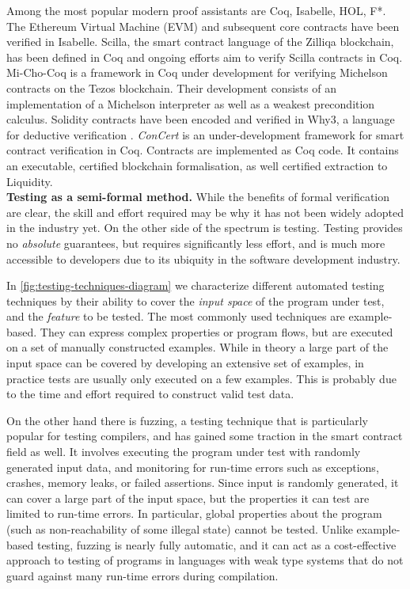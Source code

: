 \documentclass[twoside,11pt,openright]{report}
\begin{document}
Among the most popular modern proof assistants are Coq, Isabelle, HOL, F*. The Ethereum Virtual Machine (EVM) and subsequent core contracts have been verified in Isabelle\cite{10.1007/978-3-319-70278-0_33}. Scilla, the smart contract language of the Zilliqa blockchain, has been defined in Coq and ongoing efforts aim to verify Scilla contracts in Coq\cite{DBLP:journals/corr/abs-1801-00687}. Mi-Cho-Coq is a framework in Coq under development for verifying Michelson contracts on the Tezos blockchain. Their development consists of an implementation of a Michelson interpreter as
well as a weakest precondition calculus. Solidity contracts have been encoded and verified in Why3, a language for deductive verification \cite{DBLP:journals/corr/abs-1904-11281}. 
\textit{ConCert} is an under-development framework for smart contract verification in Coq\cite{DBLP:journals/corr/abs-1907-10674}\cite{nielsen2019smart}. Contracts are implemented as Coq code. It contains an executable, certified blockchain formalisation, as well certified extraction to Liquidity.
\medskip\\
\textbf{Testing as a semi-formal method.} While the benefits of formal verification are clear, the skill and effort required may be why it has not been widely adopted in the industry yet. On the other side of the spectrum is testing. Testing provides no \textit{absolute} guarantees, but requires significantly less effort, and is much more accessible to developers due to its ubiquity in the software development industry.  

In \autoref{fig:testing-techniques-diagram} we characterize different automated testing techniques by their ability to cover the \textit{input space} of the program under test, and the \textit{feature} to be tested. The most commonly used techniques are example-based. They can express complex properties or program flows, but are executed on a set of manually constructed examples. While in theory a large part of the input space can be covered by developing an extensive set of examples, in practice tests are usually only executed on a few examples. This is probably due to the time and effort required to construct valid test data.

On the other hand there is fuzzing, a testing technique that is particularly popular for testing compilers, and has gained some traction in the smart contract field as well\cite{contractfuzzing}. It involves executing the program under test with randomly generated input data, and monitoring for run-time errors such as exceptions, crashes, memory leaks, or failed assertions. Since input is randomly generated, it can cover a large part of the input space, but the properties it can test are limited to run-time errors. In particular, global properties about the program (such as non-reachability of some illegal state) cannot be tested. Unlike example-based testing, fuzzing is nearly fully automatic, and it can act as a cost-effective approach to testing of programs in languages with weak type systems that do not guard against many run-time errors during compilation.
\end{document}
